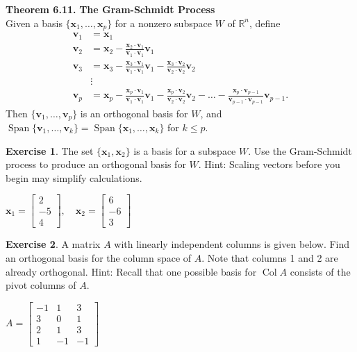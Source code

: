 \documentclass[10pt]{book}
\newcommand{\boxcolor}{gray!30}
\newenvironment{boxthm}{\begin{mdframed}[backgroundcolor=\boxcolor,nobreak=true]}{\end{mdframed}}
\theoremstyle{definition}
\newtheorem{exercise}{Exercise}[section]
\newcommand{\R}{\mathbb{R}}
\newcommand{\vect}[1]{\ensuremath{\boldsymbol{\mathbf{#1}}}}
\DeclareMathOperator{\Span}{Span}
\DeclareMathOperator{\Col}{Col}
\newcommand{\vectset}[3][v]{\{\vect{#1}_{#2},\ldots,\vect{#1}_{#3}\}}
\newcommand{\vectsetvp}{\{\vect{v}_1,\ldots,\vect{v}_p\}}
\begin{document}
\begin{boxthm}
	\textbf{Theorem 6.11.}
	\textbf{The Gram-Schmidt Process} \\
	Given a basis $\vectset[x]{1}{p}$ for a nonzero subspace $W$ of $\R^n$, define
	\vspace{-1ex}
	\begin{align*}
	\vect{v}_1 &= \vect{x}_1 \\
	\vect{v}_2 &= \vect{x}_2 - \frac{\vect{x}_2\cdot\vect{v}_1}{\vect{v}_1\cdot\vect{v}_1}\vect{v}_1 \\
	\vect{v}_3 &= \vect{x}_3 - \frac{\vect{x}_3\cdot\vect{v}_1}{\vect{v}_1\cdot\vect{v}_1}\vect{v}_1 - \frac{\vect{x}_3\cdot\vect{v}_2}{\vect{v}_2\cdot\vect{v}_2}\vect{v}_2 \\
	&\vdots \\
	\vect{v}_p &= \vect{x}_p - \frac{\vect{x}_p\cdot\vect{v}_1}{\vect{v}_1\cdot\vect{v}_1}\vect{v}_1 - \frac{\vect{x}_p\cdot\vect{v}_2}{\vect{v}_2\cdot\vect{v}_2}\vect{v}_2 - \ldots -  \frac{\vect{x}_p\cdot\vect{v}_{p-1}}{\vect{v}_{p-1}\cdot\vect{v}_{p-1}}\vect{v}_{p-1}.
	\end{align*}
	Then $\vectsetvp$ is an orthogonal basis for $W$, and $\Span\vectset{1}{k} = \Span\vectset[x]{1}{k}$ for $k\leq p$.
\end{boxthm}


\begin{exercise} %
	The set $\{\vect{x}_1,\vect{x}_2\}$ is a basis for a subspace $W$. Use the Gram-Schmidt process to produce an orthogonal basis for $W$. Hint: Scaling vectors before you begin may simplify calculations.
	
	\vspace{1em}
	$ \vect{x}_1 = \begin{bmatrix}2\\-5\\4\end{bmatrix}, \quad
	\vect{x}_2 = \begin{bmatrix}6\\-6\\3\end{bmatrix} $
\end{exercise}
\vfill


\begin{exercise} %
	A matrix $A$ with linearly independent columns is given below. Find an orthogonal basis for the column space of $A$. Note that columns 1 and 2 are already orthogonal. Hint: Recall that one possible basis for $\Col A$ consists of the pivot columns of $A$.
	
	\vspace{1em}
	$ A = \begin{bmatrix}-1&1&3\\3&0&1\\2&1&3\\1&-1&-1\end{bmatrix} $
\end{exercise}
\vfill
\end{document}

